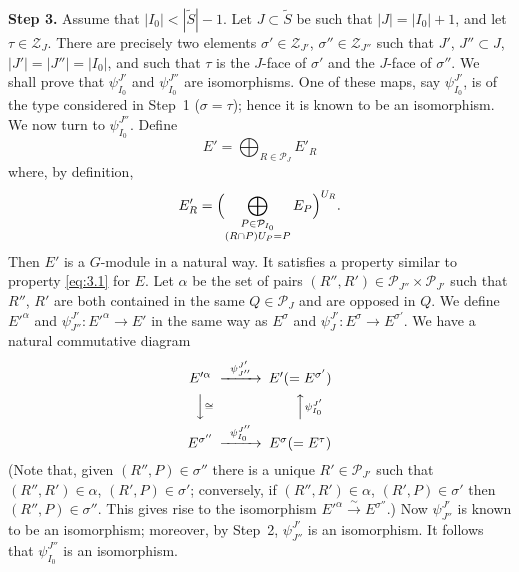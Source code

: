 \documentclass[12pt,a4paper]{article}
\theoremstyle{plain}
\theoremstyle{definition}
\theoremstyle{remark}
\newcommand{\cP}{\mathcal{P}}
\providecommand{\cP}{\mathcal{P}}
\providecommand{\cZ}{\mathcal{Z}}
\begin{document}
\smallskip
\noindent\textbf{Step 3.} Assume that $|I_0| < |\tilde{S}| - 1$. Let $J \subset \tilde{S}$ be such that $|J| = |I_0| + 1$, and let $\tau \in \cZ_J$. There are precisely two elements $\sigma' \in \cZ_{J'}$, $\sigma'' \in \cZ_{J''}$ such that $J'$, $J'' \subset J$, $|J'| = |J''| = |I_0|$, and such that $\tau$ is the $J$-face of $\sigma'$ and the $J$-face of $\sigma''$. We shall prove that $\psi_{I_0}^{J'}$ and $\psi_{I_0}^{J''}$ are isomorphisms. One of these maps, say $\psi_{I_0}^{J'}$, is of the type considered in Step~1 ($\sigma = \tau$); hence it is known to be an isomorphism. We now turn to $\psi_{I_0}^{J''}$. Define
\begin{equation*}
E' = \bigoplus_{R \in \cP_J} E'_R
\end{equation*}
where, by definition,
\begin{equation*}
E'_R = \Bigl(\bigoplus_{\substack{P \in \cP_{I_0} \\ (R \cap P)U_P = P}} E_P\Bigr)^{U_R}.
\end{equation*}
Then $E'$ is a $G$-module in a natural way. It satisfies a property similar to property \eqref{eq:3.1} for $E$. Let $\alpha$ be the set of pairs $(R'',R') \in \cP_{J''} \times \cP_{J'}$ such that $R''$, $R'$ are both contained in the same $Q \in \cP_J$ and are opposed in $Q$. We define $E'^\alpha$ and $\psi_{J''}^{J'} \colon E'^\alpha \to E'$ in the same way as $E^\sigma$ and $\psi_J^{J'} \colon E^\sigma \to E^{\sigma'}$. We have a natural commutative diagram
\begin{equation*}
\begin{CD}
E'^{\alpha} @>{\psi_{J''}^{J'}}>> E' (= E^{\sigma'}) \\
@VV{\cong}V @AA{\psi_{I_0}^{J'}}A \\
E^{\sigma''} @>{\psi_{I_0}^{J''}}>> E^{\sigma} (= E^\tau)
\end{CD}
\end{equation*}
(Note that, given $(R'',P) \in \sigma''$ there is a unique $R' \in \cP_{J'}$ such that $(R'',R') \in \alpha$, $(R',P) \in \sigma'$; conversely, if $(R'',R') \in \alpha$, $(R',P) \in \sigma'$ then $(R'',P) \in \sigma''$. This gives rise to the isomorphism $E'^{\alpha} \xrightarrow{\sim} E^{\sigma''}$.) Now $\psi_{J''}^{J'}$ is known to be an isomorphism; moreover, by Step~2, $\psi_{J''}^{J'}$ is an isomorphism. It follows that $\psi_{I_0}^{J''}$ is an isomorphism.
\end{document}
